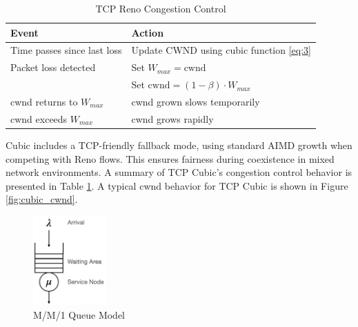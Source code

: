 \documentclass[conference]{IEEEtran}
\begin{document}
\begin{table}[!h]
    \centering
    \caption{TCP Reno Congestion Control}
    \begin{tabular}{@{}ll@{}}
        \toprule
        \textbf{Event} & \textbf{Action} \\ \midrule
        Time passes since last loss & Update CWND using cubic function \eqref{eq:3} \\
        Packet loss detected        & Set $W_{max} = \text{cwnd}$ \\
                                    & Set $\text{cwnd} = (1-\beta)\cdot W_{max}$ \\
        cwnd returns to $W_{max}$  & cwnd grown slows temporarily \\ 
        cwnd exceeds $W_{max}$     & cwnd grows rapidly \\
        \bottomrule
    \end{tabular}
    \label{tab:tcp_cubic_desc}
\end{table}

Cubic includes a TCP-friendly fallback mode, using standard AIMD growth when competing with Reno flows. 
This ensures fairness during coexistence in mixed network environments.
A summary of TCP Cubic's congestion control behavior is presented in Table \ref{tab:tcp_cubic_desc}.
A typical cwnd behavior for TCP Cubic is shown in Figure \ref{fig:cubic_cwnd}.

\begin{figure}[b]
    \centering
    \includegraphics[width=0.25\textwidth]{assets/mm1_diagram.png}
    \caption{M/M/1 Queue Model}
    \label{fig:mm1_queue}
\end{figure}
\end{document}
